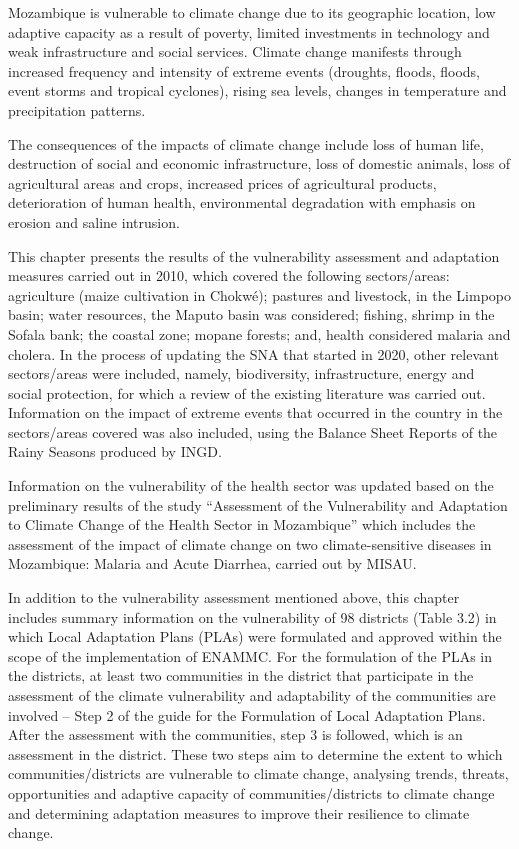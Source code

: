 \documentclass[
]{book}
\begin{document}
Mozambique is vulnerable to climate change due to its geographic location, low adaptive capacity as a result of poverty, limited investments in technology and weak infrastructure and social services. Climate change manifests through increased frequency and intensity of extreme events (droughts, floods, floods, event storms and tropical cyclones), rising sea levels, changes in temperature and precipitation patterns.

The consequences of the impacts of climate change include loss of human life, destruction of social and economic infrastructure, loss of domestic animals, loss of agricultural areas and crops, increased prices of agricultural products, deterioration of human health, environmental degradation with emphasis on erosion and saline intrusion.

This chapter presents the results of the vulnerability assessment and adaptation measures carried out in 2010, which covered the following sectors/areas: agriculture (maize cultivation in Chokwé); pastures and livestock, in the Limpopo basin; water resources, the Maputo basin was considered; fishing, shrimp in the Sofala bank; the coastal zone; mopane forests; and, health considered malaria and cholera. In the process of updating the SNA that started in 2020, other relevant sectors/areas were included, namely, biodiversity, infrastructure, energy and social protection, for which a review of the existing literature was carried out. Information on the impact of extreme events that occurred in the country in the sectors/areas covered was also included, using the Balance Sheet Reports of the Rainy Seasons produced by INGD.

Information on the vulnerability of the health sector was updated based on the preliminary results of the study ``Assessment of the Vulnerability and Adaptation to Climate Change of the Health Sector in Mozambique'' which includes the assessment of the impact of climate change on two climate-sensitive diseases in Mozambique: Malaria and Acute Diarrhea, carried out by MISAU.

In addition to the vulnerability assessment mentioned above, this chapter includes summary information on the vulnerability of 98 districts (Table 3.2) in which Local Adaptation Plans (PLAs) were formulated and approved within the scope of the implementation of ENAMMC. For the formulation of the PLAs in the districts, at least two communities in the district that participate in the assessment of the climate vulnerability and adaptability of the communities are involved -- Step 2 of the guide for the Formulation of Local Adaptation Plans. After the assessment with the communities, step 3 is followed, which is an assessment in the district. These two steps aim to determine the extent to which communities/districts are vulnerable to climate change, analysing trends, threats, opportunities and adaptive capacity of communities/districts to climate change and determining adaptation measures to improve their resilience to climate change.
\end{document}

